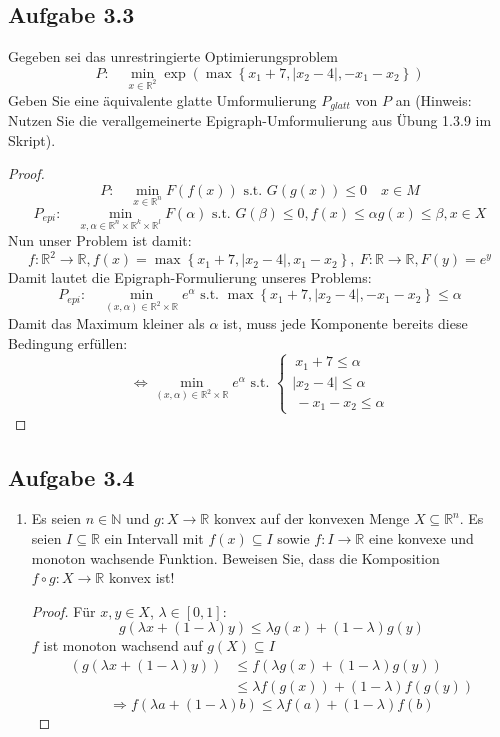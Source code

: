 \documentclass[12pt]{extreport} %
\newcommand{\N}{\mathbb{N}}
\newcommand{\R}{\mathbb{R}}
\theoremstyle{named}
\theoremstyle{nnamed}
\theoremstyle{itshape}
\theoremstyle{normal}
\begin{document}
\subsection*{Aufgabe 3.3}

Gegeben sei das unrestringierte Optimierungsproblem
	$$ P: \quad \min_{x \in \R^2} \exp \left( \max \left\{ x_1 + 7, \left| x_2 -4 \right|,-x_1 - x_2 \right\} \right)  $$
Geben Sie eine äquivalente glatte Umformulierung $P_{glatt}$ von $P$ an (Hinweis: Nutzen Sie die verallgemeinerte Epigraph-Umformulierung aus Übung 1.3.9 im Skript).

	\begin{proof}
		$$ P: \quad \min_{x \in \R^n} F(f(x)) \text{ s.t. } G(g(x)) \leq 0 \quad x \in M $$
		$$ P_{epi}: \quad \min_{x, \alpha \in \R^n \times \R^k \times \R^l} F(\alpha) \text{ s.t. } G(\beta) \leq 0, f(x) \leq \alpha g(x) \leq \beta, x \in X $$
		Nun unser Problem ist damit:
		$$ f \colon \R^2 \rightarrow \R, f(x) = \max \left\{ x_1 + 7, \left| x_2 - 4 \right|, x_1 - x_2 \right\}, ~F \colon \R \rightarrow \R, F(y) = e^y $$
		Damit lautet die Epigraph-Formulierung unseres Problems:
		$$ P_{epi}: \quad \min_{(x, \alpha) \in \R^2 \times \R} e^\alpha \text{ s.t. } \max \left\{ x_1 + 7, \left| x_2 - 4 \right|, - x_1 - x_2 \right\} \leq \alpha $$
		Damit das Maximum kleiner als $\alpha$ ist, muss jede Komponente bereits diese Bedingung erfüllen:
		$$ \iff \min_{(x , \alpha) \in \R^2 \times \R} e^{\alpha} \text{ s.t. } \begin{cases}
 	 ~x_1 + 7 \leq \alpha \\ |x_2 - 4| \leq \alpha \\ ~-x_1 - x_2 \leq \alpha \end{cases} $$
	\end{proof}

\subsection*{Aufgabe 3.4}

\begin{enumerate}
	\item Es seien $n \in \N$ und $g \colon X \rightarrow \R$ konvex auf der konvexen Menge $X \subseteq \R^n$. Es seien $I \subseteq \R$ ein Intervall mit $f(x) \subseteq I$ sowie $f \colon I \rightarrow \R$ eine konvexe und monoton wachsende Funktion. Beweisen Sie, dass die Komposition $f \circ g \colon X \rightarrow \R$ konvex ist!

		\begin{proof}
			Für $x, y \in X$, $\lambda \in [0, 1]$:
				$$ g \left( \lambda x + (1 - \lambda) y \right) \leq \lambda g(x) + (1 - \lambda) g(y) $$
			$f$ ist monoton wachsend auf $g(X) \subseteq I$
			\begin{align*}
				\left( g \left( \lambda x + (1 - \lambda) y \right) \right) & \leq f \left( \lambda g(x) + (1 - \lambda) g(y) \right)  \\
					& \leq \lambda f(g(x)) + (1 - \lambda) f(g(y))
			\end{align*} 
			$$ \Rightarrow f \left( \lambda a + (1 - \lambda) b \right) \leq \lambda f(a) + (1 - \lambda) f(b) $$
		\end{proof}
\end{enumerate}
\end{document}
